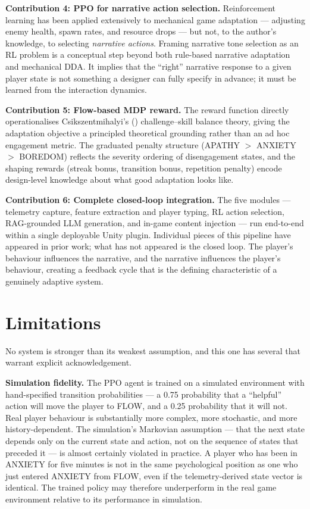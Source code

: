 \textbf{Contribution 4: PPO for narrative action selection.} Reinforcement learning has been applied extensively to mechanical game adaptation --- adjusting enemy health, spawn rates, and resource drops --- but not, to the author's knowledge, to selecting \textit{narrative actions}. Framing narrative tone selection as an RL problem is a conceptual step beyond both rule-based narrative adaptation and mechanical DDA. It implies that the ``right'' narrative response to a given player state is not something a designer can fully specify in advance; it must be learned from the interaction dynamics.

\textbf{Contribution 5: Flow-based MDP reward.} The reward function directly operationalises Csikszentmihalyi's (\citeyear{csikszentmihalyi1990flow}) challenge--skill balance theory, giving the adaptation objective a principled theoretical grounding rather than an ad hoc engagement metric. The graduated penalty structure (APATHY $>$ ANXIETY $>$ BOREDOM) reflects the severity ordering of disengagement states, and the shaping rewards (streak bonus, transition bonus, repetition penalty) encode design-level knowledge about what good adaptation looks like.

\textbf{Contribution 6: Complete closed-loop integration.} The five modules --- telemetry capture, feature extraction and player typing, RL action selection, RAG-grounded LLM generation, and in-game content injection --- run end-to-end within a single deployable Unity plugin. Individual pieces of this pipeline have appeared in prior work; what has not appeared is the closed loop. The player's behaviour influences the narrative, and the narrative influences the player's behaviour, creating a feedback cycle that is the defining characteristic of a genuinely adaptive system.

\section{Limitations}

No system is stronger than its weakest assumption, and this one has several that warrant explicit acknowledgement.

\textbf{Simulation fidelity.} The PPO agent is trained on a simulated environment with hand-specified transition probabilities --- a 0.75 probability that a ``helpful'' action will move the player to FLOW, and a 0.25 probability that it will not. Real player behaviour is substantially more complex, more stochastic, and more history-dependent. The simulation's Markovian assumption --- that the next state depends only on the current state and action, not on the sequence of states that preceded it --- is almost certainly violated in practice. A player who has been in ANXIETY for five minutes is not in the same psychological position as one who just entered ANXIETY from FLOW, even if the telemetry-derived state vector is identical. The trained policy may therefore underperform in the real game environment relative to its performance in simulation.

